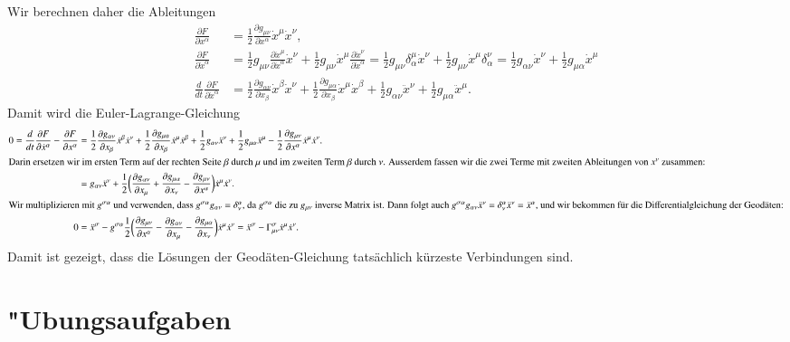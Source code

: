 Wir berechnen daher die Ableitungen
\begin{align*}
\frac{\partial F}{\partial x^\alpha}
&=
\frac12\frac{\partial g_{\mu\nu}}{\partial x^\alpha} \dot x^\mu \dot x^\nu,
\\
\frac{\partial F}{\partial \dot x^\alpha}
&=
\frac12 g_{\mu\nu}\frac{\partial \dot x^\mu}{\partial \dot x^\alpha}\dot x^\nu
+
\frac12 g_{\mu\nu}\dot x^\mu \frac{\partial \dot x^\nu}{\partial \dot x^\alpha}
=
\frac12 g_{\mu\nu}\delta^\mu_\alpha \dot x^\nu
+
\frac12 g_{\mu\nu}\dot x^\mu \delta^\nu_\alpha 
=
\frac12 g_{\alpha\nu}\dot x^\nu
+
\frac12 g_{\mu\alpha}\dot x^\mu 
\\
\frac{d}{dt}\frac{\partial F}{\partial \dot x^\alpha}
&=
\frac12\frac{\partial g_{\alpha\nu}}{\partial x_{\beta}}\dot x^\beta\dot x^\nu
+
\frac12\frac{\partial g_{\mu\alpha}}{\partial x_{\beta}}\dot x^\mu\dot x^\beta
+
\frac12g_{\alpha\nu}\ddot x^\nu
+
\frac12g_{\mu\alpha}\ddot x^\mu.
\end{align*}
Damit wird die Euler-Lagrange-Gleichung
\begin{align*}
0=
\frac{d}{dt}\frac{\partial F}{\partial \dot x^\alpha}
-
\frac{\partial F}{\partial x^\alpha}
&=
\frac12
\frac{\partial g_{\alpha\nu}}{\partial x_{\beta}}\dot x^\beta\dot x^\nu
+
\frac12
\frac{\partial g_{\mu\alpha}}{\partial x_{\beta}}\dot x^\mu\dot x^\beta
+
\frac12
g_{\alpha\nu}\ddot x^\nu
+
\frac12
g_{\mu\alpha}\ddot x^\mu
-
\frac12\frac{\partial g_{\mu\nu}}{\partial x^\alpha} \dot x^\mu \dot x^\nu.
\\
\intertext{Darin ersetzen wir im ersten Term auf der rechten Seite
$\beta$ durch $\mu$ und im zweiten Term $\beta$ durch $\nu$.
Ausserdem fassen wir die zwei Terme mit zweiten Ableitungen von $x^\nu$
zusammen:}
&=
g_{\alpha\nu}\ddot x^\nu
+
\frac12
\biggl(
\frac{\partial g_{\alpha\nu}}{\partial x_\mu}
+
\frac{\partial g_{\mu\alpha}}{\partial x_\nu}
-
\frac{\partial g_{\mu\nu}}{\partial x^\alpha}
\biggr)\dot x^\mu\dot x^\nu.
\\
\intertext{%
Wir multiplizieren mit $g^{\sigma\alpha}$ und verwenden,
dass $g^{\sigma\alpha}g_{\alpha\nu} = \delta_\nu^\alpha$, da $g^{\sigma\alpha}$
die zu $g_{\mu\nu}$ inverse Matrix ist.
Dann folgt auch
$g^{\sigma\alpha}g_{\alpha\nu}\ddot x^\nu
=
\delta_\nu^\alpha\ddot x^\nu
=
\ddot x^\alpha$, und
wir bekommen für die Differentialgleichung der Geodäten:}
0&=
\ddot x^\sigma
-
g^{\sigma\alpha}\frac12\biggl(
\frac{\partial g_{\mu\nu}}{\partial x^\alpha}
-
\frac{\partial g_{\alpha\nu}}{\partial x_{\mu}}
-
\frac{\partial g_{\mu\alpha}}{\partial x_{\nu}}
\biggr)
\dot x^\mu\dot x^\nu
=
\ddot x^\sigma
-
\Gamma_{\mu\nu}^\sigma \dot x^\mu\dot x^\nu.
\end{align*}
Damit ist gezeigt, dass die Lösungen der Geodäten-Gleichung tatsächlich
kürzeste Verbindungen sind.



\section{"Ubungsaufgaben}

